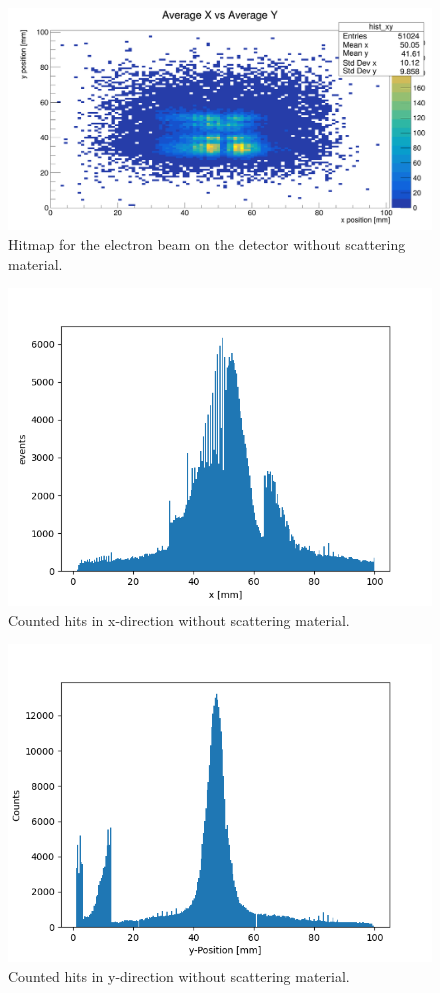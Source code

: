 \documentclass[sn-mathphys-num,iicol]{sn-jnl}
\theoremstyle{thmstyleone}
\theoremstyle{thmstyletwo}
\theoremstyle{thmstylethree}
\begin{document}
\begin{figure}
  \includegraphics[width=0.9\linewidth]{../src/elsa/finished_plots/xy_hitmap_0.png}
  \caption{Hitmap for the electron beam on the detector without scattering material.}
  \label{fig:hitmap_notarget}
\end{figure}

\begin{figure}
  \includegraphics[width=0.9\linewidth]{../src/elsa/finished_plots/UnfilteredNoMaterialX.png}
  \caption{Counted hits in x-direction without scattering material.}
  \label{fig:x_hist_notarget}
\end{figure}

\begin{figure}
  \includegraphics[width=0.9\linewidth]{../src/elsa/finished_plots/unfiltered_noMaterial.png}
  \caption{Counted hits in y-direction without scattering material.}
  \label{fig:y_hist_notarget}
\end{figure}
\end{document}
